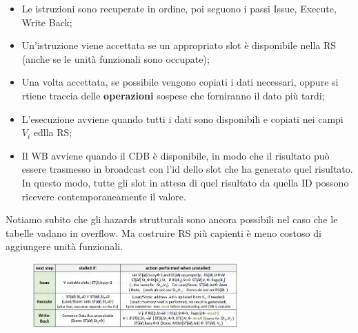 \begin{itemize}
    \item Le istruzioni sono recuperate in ordine, poi seguono i passi Issue, Execute, Write Back;
    \item Un'istruzione viene accettata se un appropriato slot è disponibile nella RS (anche se le unità funzionali sono occupate);
    \item Una volta accettata, se possibile vengono copiati i dati necessari, oppure si rtiene traccia delle \textbf{operazioni} sospese che forniranno il dato più tardi;
    \item L'esecuzione avviene quando tutti i dati sono disponibili e copiati nei campi $V_i$ edlla RS;
    \item Il WB avviene quando il CDB è disponibile, in modo che il risultato può essere trasmesso in broadcast con l'id dello slot che ha generato quel risultato. In questo modo, tutte gli slot in attesa di quel risultato da quella ID possono ricevere contemporaneamente il valore. 
\end{itemize}

\noindent Notiamo subito che gli hazards strutturali sono ancora possibili nel caso che le tabelle vadano in overflow. Ma costruire RS più capienti è meno costoso di aggiungere unità funzionali. 

\begin{figure}[ht]
    \centering
    \includegraphics[width=0.7\textwidth]{fig/chapter_2/tomasulo_transitions.png}
\end{figure}

